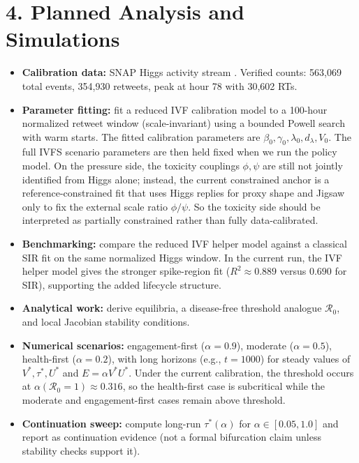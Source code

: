 \documentclass[11pt]{article}
\begin{document}
\section*{4. Planned Analysis and Simulations}
\begin{itemize}[leftmargin=1.3em]
\item \textbf{Calibration data:} SNAP Higgs activity stream \cite{snap}. Verified counts: 563,069 total events, 354,930 retweets, peak at hour 78 with 30,602 RTs.
\item \textbf{Parameter fitting:} fit a reduced IVF calibration model to a 100-hour normalized retweet window (scale-invariant) using a bounded Powell search with warm starts. The fitted calibration parameters are $\beta_0,\gamma_0,\lambda_0,d_\lambda,V_0$. The full IVFS scenario parameters are then held fixed when we run the policy model. On the pressure side, the toxicity couplings $\phi,\psi$ are still not jointly identified from Higgs alone; instead, the current constrained anchor is a reference-constrained fit that uses Higgs replies for proxy shape and Jigsaw only to fix the external scale ratio $\phi/\psi$. So the toxicity side should be interpreted as partially constrained rather than fully data-calibrated.
\item \textbf{Benchmarking:} compare the reduced IVF helper model against a classical SIR fit on the same normalized Higgs window. In the current run, the IVF helper model gives the stronger spike-region fit ($R^2\approx 0.889$ versus $0.690$ for SIR), supporting the added lifecycle structure.
\item \textbf{Analytical work:} derive equilibria, a disease-free threshold analogue $\mathcal{R}_0$, and local Jacobian stability conditions.
\item \textbf{Numerical scenarios:} engagement-first ($\alpha=0.9$), moderate ($\alpha=0.5$), health-first ($\alpha=0.2$), with long horizons (e.g., $t=1000$) for steady values of $V^*,\tau^*,U^*$ and $E=\alpha V^*U^*$. Under the current calibration, the threshold occurs at $\alpha(\mathcal{R}_0=1)\approx 0.316$, so the health-first case is subcritical while the moderate and engagement-first cases remain above threshold.
\item \textbf{Continuation sweep:} compute long-run $\tau^*(\alpha)$ for $\alpha\in[0.05,1.0]$ and report as continuation evidence (not a formal bifurcation claim unless stability checks support it).

\end{itemize}
\end{document}
